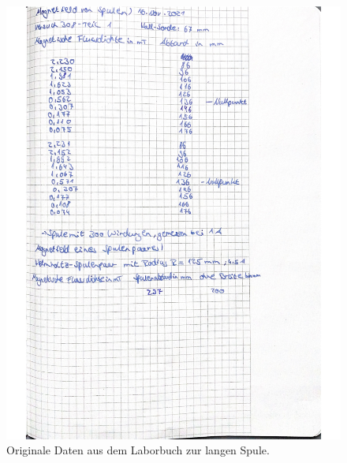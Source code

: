 \begin{figure}
  \centering
  \includegraphics{daten1.pdf}
  \caption{Originale Daten aus dem Laborbuch zur langen Spule.}
  \label{fig:DatenLangeSpule}
\end{figure}

